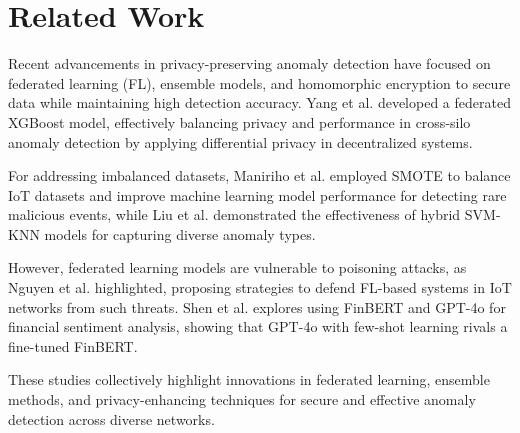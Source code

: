 \section{Related Work}
Recent advancements in privacy-preserving anomaly detection have focused on federated learning (FL), ensemble models, and homomorphic encryption to secure data while maintaining high detection accuracy. Yang et al.\cite{yang2023achieving} developed a federated XGBoost model, effectively balancing privacy and performance in cross-silo anomaly detection by applying differential privacy in decentralized systems.

For addressing imbalanced datasets, Maniriho et al.\cite{maniriho2020anomaly} employed SMOTE to balance IoT datasets and improve machine learning model performance for detecting rare malicious events, while Liu et al.\cite{liu2020anomaly} demonstrated the effectiveness of hybrid SVM-KNN models for capturing diverse anomaly types.

However, federated learning models are vulnerable to poisoning attacks, as Nguyen et al.\cite{nguyen2020poisoning} highlighted, proposing strategies to defend FL-based systems in IoT networks from such threats. Shen et al.\cite{shen2024financial} explores using FinBERT and GPT-4o for financial sentiment analysis, showing that GPT-4o with few-shot learning rivals a fine-tuned FinBERT.

These studies collectively highlight innovations in federated learning, ensemble methods, and privacy-enhancing techniques for secure and effective anomaly detection across diverse networks.